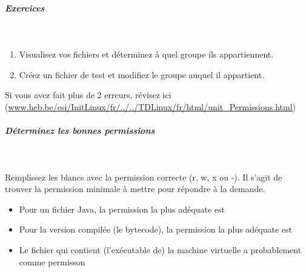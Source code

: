 \documentclass[11pt,a4paper]{article}
\begin{document}
			
		\subparagraph{Exercices} 
		
					\textcolor{white}{.} \par
				
            \par
        
					\begin{enumerate}
				
			\item Visualisez vos fichiers et d\'eterminez \`a quel groupe ils appartiennent.
			\item Cr\'eez un fichier de test et modifiez le groupe auquel il appartient.
					\end{enumerate}
				Si vous avez fait plus de 2 erreurs, r\'evisez ici (\url{www.heb.be/esi/InitLinux/fr/../../TDLinux/fr/html/unit\_Permissions.html})
            \par
        
			
		\subparagraph{D\'eterminez les bonnes permissions} 
		
                \textcolor{white}{.} \par
              
							Remplissez les blancs avec la permission correcte (r, w, x ou -). 
							Il s'agit de trouver la permission minimale \`a mettre pour r\'epondre \`a la demande.   
						
					\begin{itemize}
				
			\item 
									Pour un fichier Java, la permission la plus ad\'equate est
									 \textcolor{gray}{\underline{\hspace*{1em}}}  \textcolor{gray}{\underline{\hspace*{1em}}}  \textcolor{gray}{\underline{\hspace*{1em}}} 
			\item 
									Pour la version compil\'ee (le bytecode), la permission la plus ad\'equate est
									 \textcolor{gray}{\underline{\hspace*{1em}}}  \textcolor{gray}{\underline{\hspace*{1em}}}  \textcolor{gray}{\underline{\hspace*{1em}}} 
			\item 
									Le fichier qui contient (l'ex\'ecutable de) la machine virtuelle a probablement comme permisson
									 \textcolor{gray}{\underline{\hspace*{1em}}}  \textcolor{gray}{\underline{\hspace*{1em}}}  \textcolor{gray}{\underline{\hspace*{1em}}} 
					\end{itemize}
				
\end{document}
